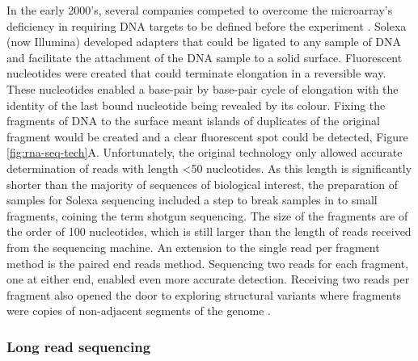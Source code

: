 \documentclass[../main.tex]{subfiles}
\begin{document}
In the early 2000's, several companies competed to overcome the microarray's deficiency in requiring DNA targets to be defined before the experiment \parencite{Rusk2007}.
Solexa (now Illumina) developed adapters that could be ligated to any sample of DNA and facilitate the attachment of the DNA sample to a solid surface. 
Fluorescent nucleotides were created that could terminate elongation in a reversible way.
These nucleotides enabled a base-pair by base-pair cycle of elongation with the identity of the last bound nucleotide being revealed by its colour.
Fixing the fragments of DNA to the surface meant islands of duplicates of the original fragment would be created and a clear fluorescent spot could be detected, Figure \ref{fig:rna-seq-tech}A.
Unfortunately, the original technology only allowed accurate determination of reads with length <50 nucleotides.
As this length is significantly shorter than the majority of sequences of biological interest, the preparation of samples for Solexa sequencing included a step to break samples in to small fragments, coining the term shotgun sequencing.
The size of the fragments are of the order of 100 nucleotides, which is still larger than the length of reads received from the sequencing machine.
An extension to the single read per fragment method is the paired end reads method.
Sequencing two reads for each fragment, one at either end, enabled even more accurate detection.
Receiving two reads per fragment also opened the door to exploring structural variants where fragments were copies of non-adjacent segments of the genome \parencite{Risca2015}.

\subsubsection{Long read sequencing}
\end{document}
